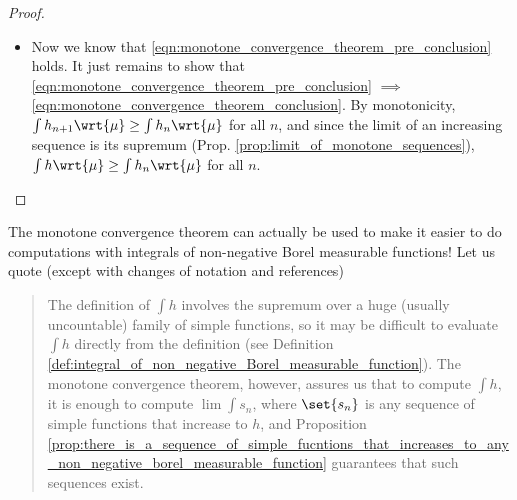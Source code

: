 \documentclass{article} %
\begin{document}
\begin{proof}
\begin{itemize}
So
\begin{align*}
 \ds\int h_n  \stackreltext{monotonicity}{\geq} \ds\int_{A_n} h_n \stackreltext{def. $A_n$, monotonicity}{\geq} \ds\int_{A_n} \alpha s \stackreltext{linearity}{=} \alpha   \ds\int_{A_n} s 
 \labelit \label{eqn:intermediate_eqn_from_proof_mct} 
 \end{align*}
   Now we recognize the right hand side as a measure on $A_n$, and since $A_n \uparrow \Omega$, we can apply continuity from below (see Remark \ref{rk:continuity_of_measure_applied_to_measures_given_by_integrals_of_simple_functions_over_sets}), so taking the limit as $n \to \infty$, Equation \eqref{eqn:intermediate_eqn_from_proof_mct} becomes
\[  \ds\lim_{n \to \infty} \ds\int h_n  \geq \alpha \ds\int s \]
Now since the equality holds for all $\alpha <1$, it holds for $\alpha =1$, and so we have
\[   \ds\lim_{n \to \infty}  \ds\int h_n  \geq \ds\int s \]
Since the LHS is an upper bound on the set in the RHS, it must be greater than the least upper bound, so 
\[   \ds\lim_{n \to \infty}  \ds\int h_n  \geq \ds\int h \]
\item Now we know that \eqref{eqn:monotone_convergence_theorem_pre_conclusion} holds.  It just remains to show that \eqref{eqn:monotone_convergence_theorem_pre_conclusion} $\implies$ \eqref{eqn:monotone_convergence_theorem_conclusion}.  By monotonicity, $\int h_{n+1} \wrt{\mu}  \geq \int h_{n} \wrt{\mu}$ for all $n$, and since the limit of an increasing sequence is its supremum (Prop. \ref{prop:limit_of_monotone_sequences}), $\int h \wrt{\mu}  \geq \int h_{n} \wrt{\mu}$ for all $n$.
\end{itemize}
\end{proof}


\begin{remark}{}
The monotone convergence theorem can actually be used to make it easier to do computations with integrals of non-negative Borel measurable functions!  Let us quote \cite{folland1999real} (except with changes of notation and references)

\begin{quotation}
 The definition of $\int h$  involves the supremum over a huge (usually uncountable) family of simple functions, so it may be difficult to evaluate $\int h$ directly from the definition (see Definition \ref{def:integral_of_non_negative_Borel_measurable_function}).  The monotone convergence theorem, however, assures us that to compute $\int h$, it is enough to compute $\lim \int s_n$, where $\set{s_n}$ is any sequence of simple functions that increase to $h$, and Proposition \ref{prop:there_is_a_sequence_of_simple_fucntions_that_increases_to_any_non_negative_borel_measurable_function} guarantees that such sequences exist. 
\end{quotation}
\end{remark}
\end{document}

